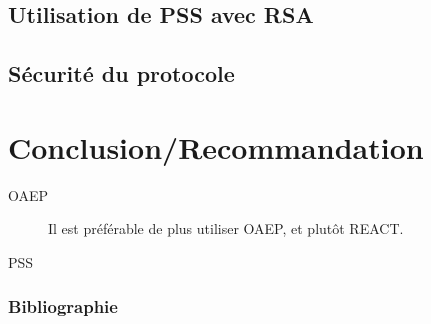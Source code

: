 \documentclass[10pt]{beamer}
\theoremstyle{plain}
\theoremstyle{definition}
\theoremstyle{remark}
\begin{document}
\subsection{Utilisation de PSS avec RSA}
\begin{frame}
\transwipe

\end{frame}
\subsection{Sécurité du protocole}
\begin{frame}
\transwipe

\end{frame}
\section{Conclusion/Recommandation}
\begin{frame}
\transwipe
\begin{description}
\item[OAEP] Il est préférable de plus utiliser OAEP, et plutôt REACT.
\item[PSS]
\end{description}

\end{frame}
\begin{frame}[shrink]
\frametitle{Bibliographie}
\nocite{*}


\end{frame}
\end{document}
